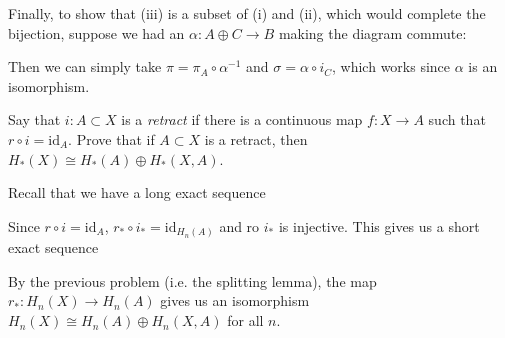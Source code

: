 \documentclass[11pt,letterpaper]{article}
\begin{document}
\begin{solution}
    Finally, to show that (iii) is a subset of (i) and (ii), which would complete the bijection, suppose we had an $\alpha : A\oplus C \to B$ making the diagram commute:
    \begin{center}
    \end{center}
    Then we can simply take $\pi = \pi_A\circ \alpha^{-1}$ and $\sigma = \alpha\circ i_C$, which works since $\alpha$ is an isomorphism. 
\end{solution}

\begin{problem}
    Say that $i : A \subset X$ is a \emph{retract} if there is a continuous map $f : X \to A$ such that $r\circ i = \text{id}_A$. Prove that if $A\subset X$ is a retract, then $H_*(X) \cong H_*(A)\oplus H_*(X,A)$.
\end{problem}

\begin{solution}
    Recall that we have a long exact sequence
    \begin{center}
    \end{center}
    Since $r\circ i = \text{id}_A$, $r_*\circ i_*=\text{id}_{H_n(A)}$ and ro $i_*$ is injective. This gives us a short exact sequence
    \begin{center}
    \end{center}
    By the previous problem (i.e. the splitting lemma), the map $r_* : H_n(X) \to H_n(A)$ gives us an isomorphism $H_n(X)\cong H_n(A)\oplus H_n(X,A)$ for all $n$. 
\end{solution}
\end{document}
